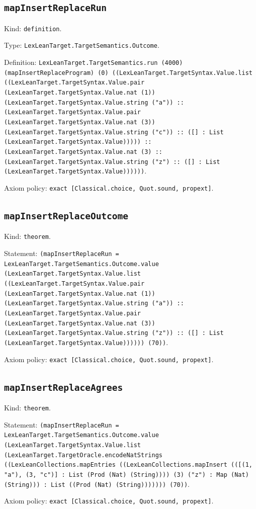 \documentclass[11pt]{article}
\begin{document}
\subsection*{\texttt{mapInsertReplaceRun}}
\noindent Kind: \texttt{definition}.\par
\noindent Type: \texttt{LexLeanTarget.TargetSemantics.Outcome}.\par
\noindent Definition: \texttt{LexLeanTarget.TargetSemantics.run (4000) (mapInsertReplaceProgram) (0) ((LexLeanTarget.TargetSyntax.Value.list ((LexLeanTarget.TargetSyntax.Value.pair (LexLeanTarget.TargetSyntax.Value.nat (1)) (LexLeanTarget.TargetSyntax.Value.string ("a")) :: (LexLeanTarget.TargetSyntax.Value.pair (LexLeanTarget.TargetSyntax.Value.nat (3)) (LexLeanTarget.TargetSyntax.Value.string ("c")) :: ([] : List (LexLeanTarget.TargetSyntax.Value))))) :: (LexLeanTarget.TargetSyntax.Value.nat (3) :: (LexLeanTarget.TargetSyntax.Value.string ("z") :: ([] : List (LexLeanTarget.TargetSyntax.Value))))))}.\par
\noindent Axiom policy: \texttt{exact [Classical.choice, Quot.sound, propext]}.\par
\subsection*{\texttt{mapInsertReplaceOutcome}}
\noindent Kind: \texttt{theorem}.\par
\noindent Statement: \texttt{(mapInsertReplaceRun = LexLeanTarget.TargetSemantics.Outcome.value (LexLeanTarget.TargetSyntax.Value.list ((LexLeanTarget.TargetSyntax.Value.pair (LexLeanTarget.TargetSyntax.Value.nat (1)) (LexLeanTarget.TargetSyntax.Value.string ("a")) :: (LexLeanTarget.TargetSyntax.Value.pair (LexLeanTarget.TargetSyntax.Value.nat (3)) (LexLeanTarget.TargetSyntax.Value.string ("z")) :: ([] : List (LexLeanTarget.TargetSyntax.Value)))))) (70))}.\par
\noindent Axiom policy: \texttt{exact [Classical.choice, Quot.sound, propext]}.\par
\subsection*{\texttt{mapInsertReplaceAgrees}}
\noindent Kind: \texttt{theorem}.\par
\noindent Statement: \texttt{(mapInsertReplaceRun = LexLeanTarget.TargetSemantics.Outcome.value (LexLeanTarget.TargetSyntax.Value.list (LexLeanTarget.TargetOracle.encodeNatStrings ((LexLeanCollections.mapEntries ((LexLeanCollections.mapInsert (([(1, "a"), (3, "c")] : List (Prod (Nat) (String)))) (3) ("z") : Map (Nat) (String))) : List ((Prod (Nat) (String))))))) (70))}.\par
\noindent Axiom policy: \texttt{exact [Classical.choice, Quot.sound, propext]}.\par
\end{document}
